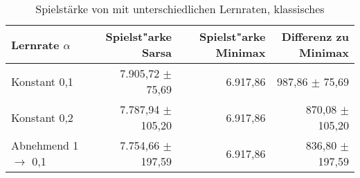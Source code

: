 \begin{table}
\centering
\caption[Spielstärke \sarsa unterschiedliche Lernraten, klassisches \splay]{Spielstärke von \sarsa mit unterschiedlichen Lernraten, klassisches \splay}
\label{tab:playingAbility_sarsa_normal}

\begin{tabular}{lrrr}
\toprule
Lernrate $\alpha$ &  Spielst"arke Sarsa & Spielst"arke Minimax & Differenz zu Minimax \\ \midrule
Konstant 0,1                    & 7.905,72 $\pm$ \phantom{0}75,69   & 6.917,86  & 987,86 $\pm$ \phantom{0}75,69 \\
Konstant 0,2                    & 7.787,94 $\pm$ 105,20             & 6.917,86  & 870,08 $\pm$ 105,20 \\
Abnehmend 1 $\rightarrow$ 0,1   & 7.754,66 $\pm$ 197,59             & 6.917,86  & 836,80 $\pm$ 197,59 \\ \bottomrule

\end{tabular}
\end{table}